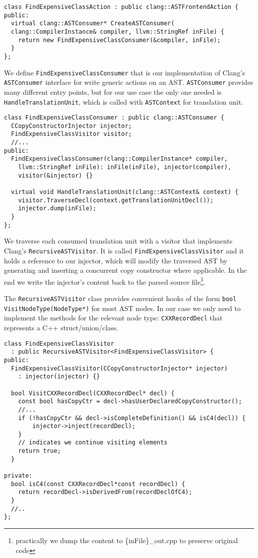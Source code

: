 \documentclass{article}
\begin{document}
\begin{verbatim}
class FindExpensiveClassAction : public clang::ASTFrontendAction {
public:
  virtual clang::ASTConsumer* CreateASTConsumer(
  clang::CompilerInstance& compiler, llvm::StringRef inFile) {
    return new FindExpensiveClassConsumer(&compiler, inFile);
  }
};
\end{verbatim}

We define \texttt{FindExpensiveClassConsumer} that is our implementation of Clang's \texttt{ASTConsumer} interface for write generic actions on an AST. \texttt{ASTConsumer} provides many different entry points, but for our use case the only one needed is \texttt{HandleTranslationUnit}, which is called with \texttt{ASTContext} for translation unit.

\begin{verbatim}
class FindExpensiveClassConsumer : public clang::ASTConsumer {
  CCopyConstructorInjector injector;
  FindExpensiveClassVisitor visitor;
  //...
public:
  FindExpensiveClassConsumer(clang::CompilerInstance* compiler,
  	llvm::StringRef inFile): inFile(inFile), injector(compiler),
  	visitor(&injector) {}
  
  virtual void HandleTranslationUnit(clang::ASTContext& context) {
    visitor.TraverseDecl(context.getTranslationUnitDecl());
    injector.dump(inFile);
  }
};
\end{verbatim}

We traverse each consumed translation unit with a visitor that implements Clang's \texttt{RecursiveASTVisitor}. It is called \texttt{FindExpensiveClassVisitor} and it holds a reference to our injector, which will modify the traversed AST by generating and inserting a concurrent copy constructor where applicable. In the end we write the injector's content back to the parsed source file\footnote{practically we dump the content to \{inFile\}\_out.cpp to preserve original code}.

The \texttt{RecursiveASTVisitor} class provides convenient hooks of the form \texttt{bool VisitNodeType(NodeType*)} for most AST nodes. In our case we only need to implement the methods for the relevant node type: \texttt{CXXRecordDecl} that represents a C++ struct/union/class.

\begin{verbatim}
class FindExpensiveClassVisitor
  : public RecursiveASTVisitor<FindExpensiveClassVisitor> {
public:
  FindExpensiveClassVisitor(CCopyConstructorInjector* injector)
    : injector(injector) {}

  bool VisitCXXRecordDecl(CXXRecordDecl* decl) {
    const bool hasCopyCtr = decl->hasUserDeclaredCopyConstructor();
    //...
    if (!hasCopyCtr && decl->isCompleteDefinition() && isC4(decl)) {
   	    injector->inject(recordDecl);
    }
    // indicates we continue visiting elements
    return true;
  }

private:
  bool isC4(const CXXRecordDecl*const recordDecl) {
    return recordDecl->isDerivedFrom(recordDeclOfC4);
  }
  //..
};
\end{verbatim}
\end{document}
